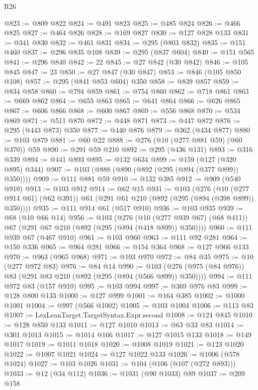 \begin{lexlean}{R26}
\begin{coremodule}
@823 := @809 @822
@824 := @491 @823
@825 := @485 @824
@826 := @466 @825
@827 := @464 @826
@828 := @169 @827
@830 := @127 @828 @133
@831 := @341 @830
@832 := @461 @831
@834 := @295 (@803 @832)
@835 := @151 @460
@837 := @296 @835 @108
@839 := @295 (@837 @604)
@840 := @151 @565
@841 := @296 @840
@842 := 22
@845 := @27 @842 (@30 @842)
@846 := @105 @845
@847 := 23
@850 := @27 @847 (@30 @847)
@853 := @846 (@105 @850 @108)
@857 := @295 (@841 @853 @604) @350
@858 := @839 @857
@859 := @834 @858
@860 := @794 @859
@861 := @754 @860
@862 := @718 @861
@863 := @669 @862
@864 := @655 @863
@865 := @641 @864
@866 := @626 @865
@867 := @606 @866
@868 := @600 @867
@869 := @556 @868
@870 := @534 @869
@871 := @511 @870
@872 := @448 @871
@873 := @447 @872
@876 := @295 (@443 @873) @350
@877 := @440 @876
@879 := @362 (@434 @877)
@880 := @103 @879
@881 := @60 @22
@888 := @276 (@10 (@277 @881 @59) (@60 @370)) @59
@890 := @291 @59 @210
@892 := @295 (@436 @131)
@893 := @316 @339
@894 := @441 @893
@895 := @132 @634
@899 := @159 (@127 (@320 @895) @344)
@907 := @103 (@888 (@890 (@892 (@295 (@894 (@377 @899)) @350))))
@909 := @111 @881 @59
@910 := @132 @385
@912 := @909 (@540 @910)
@913 := @103 @912
@914 := @62 @15
@931 := @103
    (@276
      (@10 (@277 @914 @61) (@62 @391))
      @61
      (@291 @61 @210 (@892 (@295 (@894 (@398 @899)) @350))))
@935 := @111 @914 @61 (@517 @910)
@936 := @103 @935
@939 := @68 (@10 @66 @14)
@956 := @103
    (@276
      (@10 (@277 @939 @67) (@68 @411))
      @67
      (@291 @67 @210 (@892 (@295 (@894 (@418 @899)) @350))))
@960 := @111 @939 @67 (@467 @910)
@961 := @103 @960
@963 := @111 @92 @281
@964 := @150 @336
@965 := @964 @281
@966 := @154 @364
@968 := @127 @966 @133
@970 := @963 (@965 @968)
@971 := @103 @970
@972 := @84 @35
@975 := @10 (@277 @972 @83)
@976 := @84 @14
@990 := @103 (@276 (@975 (@84 @976)) @83 (@291 @83 @210 (@892 (@295 (@894 (@566 @899)) @350))))
@994 := @111 @972 @83 (@157 @910)
@995 := @103 @994
@997 := @369 @976 @83
@999 := @128 @800 @133
@1000 := @127 @999
@1001 := @164 @385
@1002 := @1000 @1001
@1004 := @997 (@566 @1002)
@1005 := @103 @1004
@1006 := @113 @83
@1007 := LexLeanTarget.TargetSyntax.Expr.second
@1008 := @124 @845
@1010 := @128 @850 @133
@1011 := @127 @1010
@1013 := @63 @33 @83
@1014 := @301 @1013
@1015 := @1014 @166
@1017 := @127 @1015 @133
@1018 := @149 @1017
@1019 := @1011 @1018
@1020 := @1008 @1019
@1021 := @123 @1020
@1022 := @1007 @1021
@1024 := @127 @1022 @133
@1026 := @1006 (@578 @1024)
@1027 := @103 @1026
@1031 := @104 (@106 (@107 (@272 @893)))
@1033 := @12 (@34 @112)
@1036 := @1031 (@90 @1033) @89
@1037 := @209 @158

\end{coremodule}
\end{lexlean}
